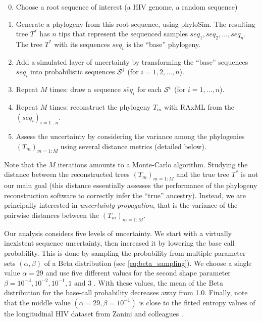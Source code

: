 \documentclass[10pt]{article}
\begin{document}
\begin{enumerate}
\setcounter{enumi}{-1} 

\item Choose a root sequence of interest (\eg a HIV genome, a random sequence)

\item Generate a phylogeny from this root sequence, using \textsf{phyloSim}. The resulting tree $T^*$ has $n$ tips that represent the sequenced samples $seq_1, seq_2,\ldots, seq_n$. The tree $T^*$ with its sequences $seq_i$ is the ``base'' phylogeny.

\item Add a simulated layer of uncertainty by transforming the ``base'' sequences $seq_i$ into probabilistic sequences $\mathcal{S}^i$ (for $i=1,2,\ldots,n$).

\item Repeat $M$ times: 
draw a sequence $\widetilde{seq_i}$ for each $\mathcal{S}^i$ (for $i=1,\ldots, n$).

\item Repeat $M$ times: reconstruct the phylogeny $T_m$ with \textsf{RAxML} from the $(\widetilde{seq_i})_{i=1\ldots n}$. 

\item \label{item:assess} Assess the uncertainty by considering the variance among the phylogenies $(T_m)_{m=1:M}$ using several distance metrics (detailed below).
\end{enumerate}

\noindent Note that the $M$ iterations amounts to a Monte-Carlo algorithm.
Studying the distance between the reconstructed trees $(T_m)_{m=1:M}$ and the true tree $T^*$ is not our main goal (this distance essentially assesses the performance of the phylogeny reconstruction software to correctly infer the ``true'' ancestry).
Instead, we are principally interested in \emph{uncertainty propagation}, that is the variance of the pairwise distances between the $(T_m)_{m=1:M}$.

Our analysis considers five levels of uncertainty. We start with a virtually inexistent sequence uncertainty, then increased it by lowering the base call probability. This is done by sampling the probability from multiple parameter sets $(\alpha,\beta)$ of a Beta distribution (see \autoref{eq:beta_sampling}). 
We choose a single value $\alpha=29$ and use five different values for the second shape parameter $\beta = 10^{-3}, 10^{-2}, 10^{-1}, 1 \text{ and } 3$ .
With these values, the mean of the Beta distribution for the base-call probability decreases away from 1.0. 
Finally, note that the middle value $(\alpha=29, \beta=10^{-1})$ is close to the fitted entropy values of the longitudinal HIV dataset from Zanini and colleagues \cite{Zanini:2015}.
\end{document}
